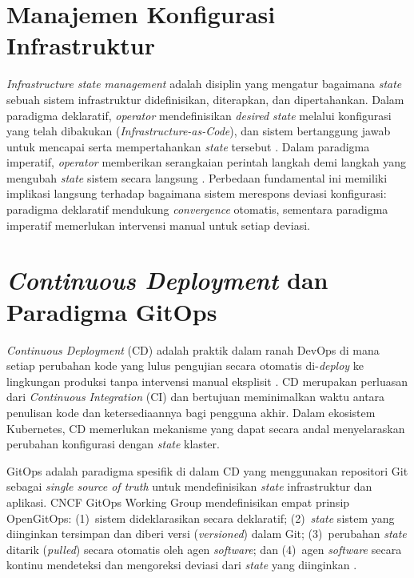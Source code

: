 \section{Manajemen Konfigurasi Infrastruktur}

\textit{Infrastructure state management} adalah disiplin yang mengatur bagaimana \textit{state} sebuah sistem infrastruktur didefinisikan, diterapkan, dan dipertahankan. Dalam paradigma deklaratif, \textit{operator} mendefinisikan \textit{desired state} melalui konfigurasi yang telah dibakukan (\textit{Infrastructure-as-Code}), dan sistem bertanggung jawab untuk mencapai serta mempertahankan \textit{state} tersebut \citep{morris2020iac}. Dalam paradigma imperatif, \textit{operator} memberikan serangkaian perintah langkah demi langkah yang mengubah \textit{state} sistem secara langsung \citep{limoncelli2018}. Perbedaan fundamental ini memiliki implikasi langsung terhadap bagaimana sistem merespons deviasi konfigurasi: paradigma deklaratif mendukung \textit{convergence} otomatis, sementara paradigma imperatif memerlukan intervensi manual untuk setiap deviasi.

\section{\textit{Continuous Deployment} dan Paradigma GitOps}

\textit{Continuous Deployment} (CD) adalah praktik dalam ranah DevOps di mana setiap perubahan kode yang lulus pengujian secara otomatis di-\textit{deploy} ke lingkungan produksi tanpa intervensi manual eksplisit \citep{limoncelli2018, ebert2016devops}. CD merupakan perluasan dari \textit{Continuous Integration} (CI) dan bertujuan meminimalkan waktu antara penulisan kode dan ketersediaannya bagi pengguna akhir. Dalam ekosistem Kubernetes, CD memerlukan mekanisme yang dapat secara andal menyelaraskan perubahan konfigurasi dengan \textit{state} klaster.

GitOps adalah paradigma spesifik di dalam CD yang menggunakan repositori Git sebagai \textit{single source of truth} untuk mendefinisikan \textit{state} infrastruktur dan aplikasi. CNCF GitOps Working Group mendefinisikan empat prinsip OpenGitOps: (1)~sistem dideklarasikan secara deklaratif; (2)~\textit{state} sistem yang diinginkan tersimpan dan diberi versi (\textit{versioned}) dalam Git; (3)~perubahan \textit{state} ditarik (\textit{pulled}) secara otomatis oleh agen \textit{software}; dan (4)~agen \textit{software} secara kontinu mendeteksi dan mengoreksi deviasi dari \textit{state} yang diinginkan \citep{opengitops2021}.

